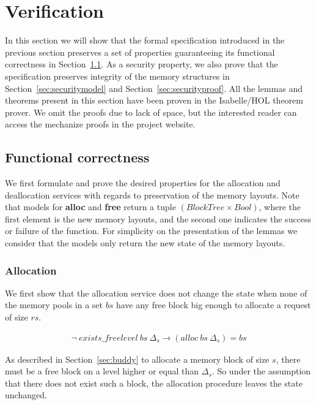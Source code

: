 \section{Verification}
In this section we will show that the formal specification introduced in the previous section preserves a set of properties guaranteeing its functional correctness in Section~\ref{sec:functional}. As a security property, we also prove that the specification preserves integrity of the memory structures in Section~\ref{sec:securitymodel} and Section~\ref{sec:securityproof}. All the lemmas and theorems present in this section have been proven in the Isabelle/HOL theorem prover. We omit the proofs due to lack of space, but the interested reader can access the mechanize proofs in the project website.

\subsection{Functional correctness}\label{sec:functional}
We first formulate and prove the desired properties for the allocation and deallocation services with regards to preservation of the memory layouts. Note that models for \textbf{alloc} and \textbf{free} return a tuple $(BlockTree \times Bool)$, where the first element is the new memory layouts, and the second one indicates the success or failure of the function. For simplicity on the presentation of the lemmas we consider that the models only return the new state of the memory layouts.

\subsubsection{Allocation}\label{sec:functionalalloc}
We first show that the allocation service does not change the state when none of the memory pools in a set $bs$ have any free block big enough to allocate a request of size $rs$. 

\begin{lemma} 
\label{lemma:no_free_space}
\begin{align*}
\neg\ exists\_freelevel\ bs\ \Delta_s \longrightarrow (alloc\ bs\ \Delta_s) = bs
\end{align*}
\end{lemma}

As described in Section~\ref{sec:buddy} to allocate a memory block of size $s$, there must be a free block on a level higher or equal than $\Delta_s$. So under the assumption that there does not exist such a block, the allocation procedure leaves the state unchanged.


